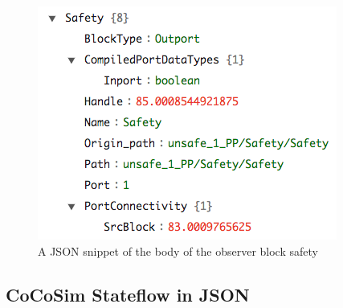 \documentclass{article}
\begin{document}
\begin{figure}[h]
\begin{center}
    \includegraphics[scale=0.35]{figures/safety6}       
    
\end{center}  
  \caption{A JSON snippet of the body of the observer block \textsf{safety}}
  \label{jsonsafetybody}
\end{figure}

\subsection{CoCoSim Stateflow in JSON}
\end{document}
